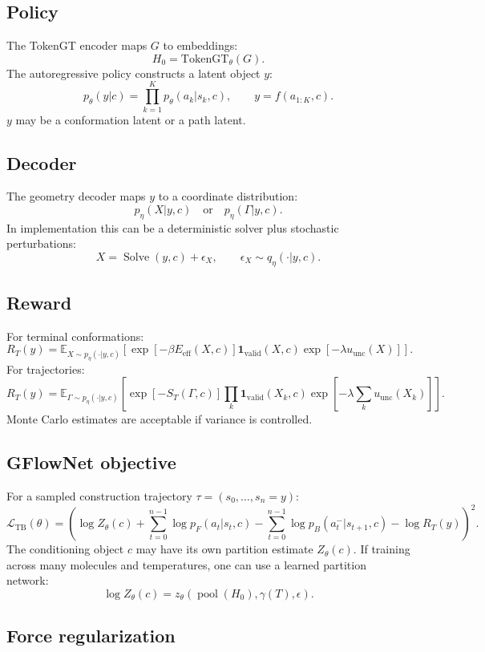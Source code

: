 \documentclass[11pt]{article}
\newcommand{\E}{\mathbb{E}}
\newcommand{\tokgt}{\mathrm{TokenGT}}
\begin{document}
\subsection{Policy}

The TokenGT encoder maps $G$ to embeddings:
\[
H_0=\tokgt_\theta(G).
\]
The autoregressive policy constructs a latent object $y$:
\[
p_\theta(y|c)=\prod_{k=1}^{K}p_\theta(a_k|s_k,c),
\qquad y=f(a_{1:K},c).
\]
$y$ may be a conformation latent or a path latent.

\subsection{Decoder}

The geometry decoder maps $y$ to a coordinate distribution:
\[
p_\eta(X|y,c)
\quad\text{or}\quad
p_\eta(\Gamma|y,c).
\]
In implementation this can be a deterministic solver plus stochastic perturbations:
\[
X=\operatorname{Solve}(y,c)+\epsilon_X,
\qquad \epsilon_X\sim q_\eta(\cdot|y,c).
\]

\subsection{Reward}

For terminal conformations:
\[
R_T(y)=
\E_{X\sim p_\eta(\cdot|y,c)}
\left[
\exp[-\beta E_{\mathrm{eff}}(X,c)]
\mathbf{1}_{\mathrm{valid}}(X,c)
\exp[-\lambda u_{\mathrm{unc}}(X)]
\right].
\]
For trajectories:
\[
R_T(y)=
\E_{\Gamma\sim p_\eta(\cdot|y,c)}
\left[
\exp[-S_T(\Gamma,c)]
\prod_k \mathbf{1}_{\mathrm{valid}}(X_k,c)
\exp[-\lambda\sum_k u_{\mathrm{unc}}(X_k)]
\right].
\]
Monte Carlo estimates are acceptable if variance is controlled.

\subsection{GFlowNet objective}

For a sampled construction trajectory $\tau=(s_0,\dots,s_n=y)$:
\[
\mathcal{L}_{\mathrm{TB}}(\theta)=
\left(
\log Z_\theta(c)
+\sum_{t=0}^{n-1}\log p_F(a_t|s_t,c)
-\sum_{t=0}^{n-1}\log p_B(a_t^-|s_{t+1},c)
-\log R_T(y)
\right)^2.
\]
The conditioning object $c$ may have its own partition estimate $Z_\theta(c)$. If training across many molecules and temperatures, one can use a learned partition network:
\[
\log Z_\theta(c)=z_\theta(\operatorname{pool}(H_0),\gamma(T),\epsilon).
\]

\subsection{Force regularization}
\end{document}
